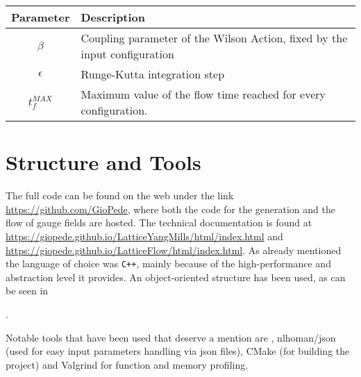 \begin{table}[!htb]
\begin{center}
\begin{tabular}{cl}
    Parameter & Description\\\hline
    $\beta$ & Coupling parameter of the Wilson Action, fixed by the input configuration\\
    $\epsilon$ & Runge-Kutta integration step\\
    $t_f^{MAX}$ & Maximum value of the flow time reached for every configuration. 
\end{tabular}
\label{FLOW:params}
\end{center}
\end{table}


\section{Structure and Tools}
The full code can be found on the web under the link \url{https://github.com/GioPede}, where both the code for the generation and the flow of gauge fields are hosted. The technical documentation is found at \url{https://giopede.github.io/LatticeYangMills/html/index.html} and \url{https://giopede.github.io/LatticeFlow/html/index.html}. As already mentioned the language of choice was \texttt{C++}, mainly because of the high-performance and abstraction level it  provides. An object-oriented structure has been used, as can be seen in 

. 

Notable tools that have been used that deserve a mention are \mpi, nlhoman/json \cite{_nlohmann/json} (used for easy input parameters handling via json files), CMake (for building the project) and Valgrind for function and memory profiling. 
